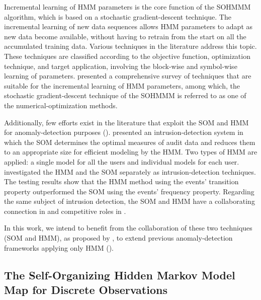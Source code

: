 Incremental learning of HMM parameters is the core function of the SOHMMM algorithm, which is based on a stochastic gradient-descent technique. The incremental learning of new data sequences allows HMM parameters to adapt as new data become available, without having to retrain from the start on all the accumulated training data. Various techniques in the literature address this topic. These techniques are classified according to the objective function, optimization technique, and target application, involving the block-wise and symbol-wise learning of parameters. \citet{Khreich2012} presented a comprehensive survey of techniques that are suitable for the incremental learning of HMM parameters, among which, the stochastic gradient-descent technique of the SOHMMM is referred to as one of the numerical-optimization methods.

Additionally, few efforts exist in the literature that exploit the SOM and HMM for anomaly-detection purposes (\citet{Cho2002,Wang2006}). \citet{Cho2002} presented an intrusion-detection system in which the SOM determines the optimal measures of audit data and reduces them to an appropriate size for efficient modeling by the HMM. Two types of HMM are applied: a single model for all the users and individual models for each user. \citet{Wang2006} investigated the HMM and the SOM separately as intrusion-detection techniques. The testing results show that the HMM method using the events' transition property outperformed the SOM using the events' frequency property. Regarding the same subject of intrusion detection, the SOM and HMM have a collaborating connection in \cite{Cho2002} and competitive roles in \cite{Wang2006}.

In this work, we intend to benefit from the collaboration of these two techniques (SOM and HMM), as proposed by \citet{Ferles2008}, to extend previous anomaly-detection frameworks applying only HMM (\citet{Anisa2014,Anisa2017,Anisa2019}).

\subsection{The Self-Organizing Hidden Markov Model Map for Discrete Observations}
\label{sec:sohmmm_background}

